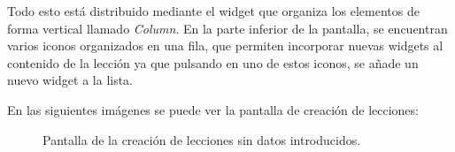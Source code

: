\newpage

Todo esto está distribuido mediante el widget que organiza los elementos de forma vertical llamado \textit{Column}. 
En la parte inferior de la pantalla, se encuentran varios iconos organizados en una fila, que permiten incorporar nuevas widgets al contenido de la lección
ya que pulsando en uno de estos iconos, se añade un nuevo widget a la lista.

En las siguientes imágenes se puede ver la pantalla de creación de lecciones:

\begin{figure}[H]%
  \centering
  \qquad
  \caption{Pantalla de la creación de lecciones sin datos introducidos.}%
  \label{fig:creacionleccionvacia}%
\end{figure}


